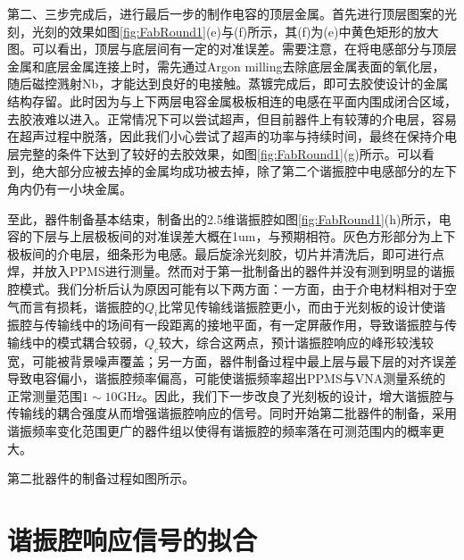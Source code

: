             第二、三步完成后，进行最后一步的制作电容的顶层金属。首先进行顶层图案的光刻，光刻的效果如图\ref{fig:FabRound1}(e)与(f)所示，其(f)为(e)中黄色矩形的放大图。可以看出，顶层与底层间有一定的对准误差。需要注意，在将电感部分与顶层金属和底层金属连接上时，需先通过Argon milling去除底层金属表面的氧化层，随后磁控溅射Nb，才能达到良好的电接触。蒸镀完成后，即可去胶使设计的金属结构存留。此时因为与上下两层电容金属极板相连的电感在平面内围成闭合区域，去胶液难以进入。正常情况下可以尝试超声，但目前器件上有较薄的介电层，容易在超声过程中脱落，因此我们小心尝试了超声的功率与持续时间，最终在保持介电层完整的条件下达到了较好的去胶效果，如图\ref{fig:FabRound1}(g)所示。可以看到，绝大部分应被去掉的金属均成功被去掉，除了第二个谐振腔中电感部分的左下角内仍有一小块金属。

            至此，器件制备基本结束，制备出的2.5维谐振腔如图\ref{fig:FabRound1}(h)所示，电容的下层与上层极板间的对准误差大概在1um，与预期相符。灰色方形部分为上下极板间的介电层，细条形为电感。最后旋涂光刻胶，切片并清洗后，即可进行点焊，并放入PPMS进行测量。然而对于第一批制备出的器件并没有测到明显的谐振腔模式。我们分析后认为原因可能有以下两方面：一方面，由于介电材料相对于空气而言有损耗，谐振腔的$Q_i$比常见传输线谐振腔更小，而由于光刻板的设计使谐振腔与传输线中的场间有一段距离的接地平面，有一定屏蔽作用，导致谐振腔与传输线中的模式耦合较弱，$Q_c$较大，综合这两点，预计谐振腔响应的峰形较浅较宽，可能被背景噪声覆盖；另一方面，器件制备过程中最上层与最下层的对齐误差导致电容偏小，谐振腔频率偏高，可能使谐振频率超出PPMS与VNA测量系统的正常测量范围$1\sim 10$GHz。因此，我们下一步改良了光刻板的设计，增大谐振腔与传输线的耦合强度从而增强谐振腔响应的信号。同时开始第二批器件的制备，采用谐振频率变化范围更广的器件组以使得有谐振腔的频率落在可测范围内的概率更大。

            第二批器件的制备过程如图所示。






            



            \section{谐振腔响应信号的拟合} %
            \label{sec:谐振腔响应信号的拟合}
            	









